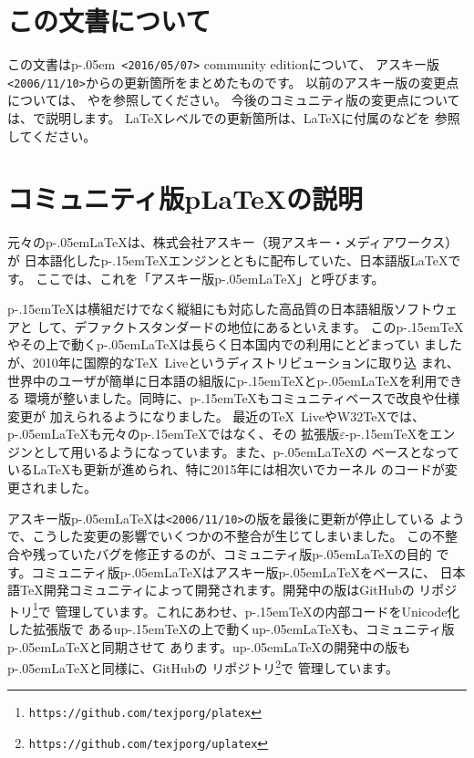 \documentclass{plnews}
\author{日本語\TeX{}開発コミュニティ（\texttt{https://texjp.org/}）}
\def\pTeX{p\kern-.15em\TeX}
\def\epTeX{$\varepsilon$-\pTeX}
\def\pLaTeX{p\kern-.05em\LaTeX}
\def\pLaTeXe{p\kern-.05em\LaTeXe}
\begin{document}
\maketitle

\section{この文書について}
この文書は\pLaTeXe\ \texttt{<2016/05/07>} community editionについて、
アスキー版\texttt{<2006/11/10>}からの更新箇所をまとめたものです。
以前のアスキー版の変更点については、
やを参照してください。
今後のコミュニティ版の変更点については、で説明します。
\LaTeX{}レベルでの更新箇所は、\LaTeX{}に付属のなどを
参照してください。


\section{コミュニティ版p\LaTeX{}の説明}
元々の\pLaTeX{}は、株式会社アスキー（現アスキー・メディアワークス）が
日本語化した\pTeX{}エンジンとともに配布していた、日本語版\LaTeX{}です。
ここでは、これを「アスキー版\pLaTeX{}」と呼びます。

\pTeX{}は横組だけでなく縦組にも対応した高品質の日本語組版ソフトウェアと
して、デファクトスタンダードの地位にあるといえます。
この\pTeX{}やその上で動く\pLaTeX{}は長らく日本国内での利用にとどまってい
ましたが、2010年に国際的な\TeX\ Liveというディストリビューションに取り込
まれ、世界中のユーザが簡単に日本語の組版に\pTeX{}と\pLaTeX{}を利用できる
環境が整いました。同時に、\pTeX{}もコミュニティベースで改良や仕様変更が
加えられるようになりました。
最近の\TeX\ LiveやW32\TeX{}では、\pLaTeX{}も元々の\pTeX{}ではなく、その
拡張版\epTeX{}をエンジンとして用いるようになっています。また、\pLaTeX{}の
ベースとなっている\LaTeX{}も更新が進められ、特に2015年には相次いでカーネル
のコードが変更されました。

アスキー版\pLaTeX{}は\texttt{<2006/11/10>}の版を最後に更新が停止している
ようで、こうした変更の影響でいくつかの不整合が生じてしまいました。
この不整合や残っていたバグを修正するのが、コミュニティ版\pLaTeX{}の目的
です。コミュニティ版\pLaTeX{}はアスキー版\pLaTeX{}をベースに、
日本語\TeX{}開発コミュニティによって開発されます。開発中の版はGitHubの
リポジトリ\footnote{\texttt{https://github.com/texjporg/platex}}で
管理しています。これにあわせ、\pTeX{}の内部コードをUnicode化した拡張版で
あるu\pTeX{}の上で動くu\pLaTeX{}も、コミュニティ版\pLaTeX{}と同期させて
あります。u\pLaTeX{}の開発中の版も\pLaTeX{}と同様に、GitHubの
リポジトリ\footnote{\texttt{https://github.com/texjporg/uplatex}}で
管理しています。
\end{document}
